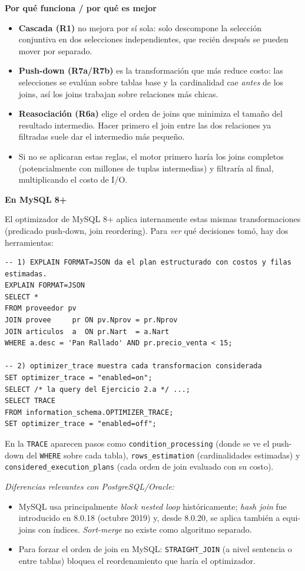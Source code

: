 \documentclass[11pt,a4paper]{article}
\newcommand{\itemcabecera}[1]{\noindent\textbf{#1}\par\medskip}
\newcommand{\bloquePorque}{\itemcabecera{Por qu\'e funciona / por qu\'e es mejor}}
\newcommand{\bloqueMySQL}{\itemcabecera{En MySQL 8+}}
\begin{document}
\bloquePorque

\begin{itemize}
    \item \textbf{Cascada (R1)} no mejora por sí sola: solo descompone la selección conjuntiva en dos selecciones independientes, que recién después se pueden mover por separado.
    \item \textbf{Push-down (R7a/R7b)} es la transformación que más reduce costo: las selecciones se evalúan sobre tablas base y la cardinalidad cae \emph{antes} de los joins, así los joins trabajan sobre relaciones más chicas.
    \item \textbf{Reasociación (R6a)} elige el orden de joins que minimiza el tamaño del resultado intermedio. Hacer primero el join entre las dos relaciones ya filtradas suele dar el intermedio más pequeño.
    \item Si no se aplicaran estas reglas, el motor primero haría los joins completos (potencialmente con millones de tuplas intermedias) y filtraría al final, multiplicando el costo de I/O.
\end{itemize}

\bloqueMySQL

El optimizador de MySQL 8+ aplica internamente estas mismas transformaciones (predicado push-down, join reordering). Para \emph{ver} qué decisiones tomó, hay dos herramientas:

\begin{lstlisting}
-- 1) EXPLAIN FORMAT=JSON da el plan estructurado con costos y filas estimadas.
EXPLAIN FORMAT=JSON
SELECT *
FROM proveedor pv
JOIN provee     pr ON pv.Nprov = pr.Nprov
JOIN articulos  a  ON pr.Nart  = a.Nart
WHERE a.desc = 'Pan Rallado' AND pr.precio_venta < 15;

-- 2) optimizer_trace muestra cada transformacion considerada
SET optimizer_trace = "enabled=on";
SELECT /* la query del Ejercicio 2.a */ ...;
SELECT TRACE
FROM information_schema.OPTIMIZER_TRACE;
SET optimizer_trace = "enabled=off";
\end{lstlisting}

En la \texttt{TRACE} aparecen pasos como \texttt{condition\_processing} (donde se ve el push-down del \texttt{WHERE} sobre cada tabla), \texttt{rows\_estimation} (cardinalidades estimadas) y \texttt{considered\_execution\_plans} (cada orden de join evaluado con su costo).

\textit{Diferencias relevantes con PostgreSQL/Oracle:}

\begin{itemize}
    \item MySQL usa principalmente \emph{block nested loop} históricamente; \emph{hash join} fue introducido en 8.0.18 (octubre 2019) y, desde 8.0.20, se aplica también a equi-joins con índices. \emph{Sort-merge} no existe como algoritmo separado.
    \item Para forzar el orden de join en MySQL: \texttt{STRAIGHT\_JOIN} (a nivel sentencia o entre tablas) bloquea el reordenamiento que haría el optimizador.
\end{itemize}
\end{document}
